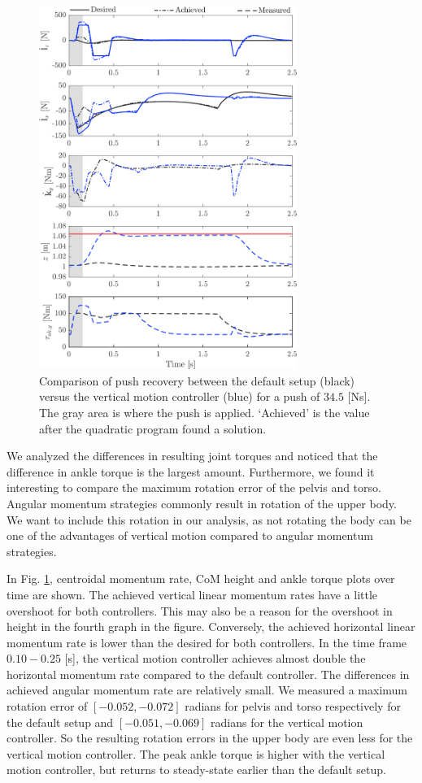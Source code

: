 \documentclass[letterpaper, 10 pt, conference]{ieeeconf}  %
\begin{document}
\begin{figure}[h]
      \centering
      \includegraphics[width=3.3in]{valcomparetime.png}
      \caption{Comparison of push recovery between the default setup (black) versus the vertical motion controller (blue) for a push of $34.5$ [Ns]. The gray area is where the push is applied. `Achieved' is the value after the quadratic program found a solution.}
      \label{fig:valcompare}
\end{figure}

We analyzed the differences in resulting joint torques and noticed that the difference in ankle torque is the largest amount. Furthermore, we found it interesting to compare the maximum rotation error of the pelvis and torso. Angular momentum strategies commonly result in rotation of the upper body. We want to include this rotation in our analysis, as not rotating the body can be one of the advantages of vertical motion compared to angular momentum strategies.

In Fig. \ref{fig:valcompare}, centroidal momentum rate, CoM height and ankle torque plots over time are shown. The achieved vertical linear momentum rates have a little overshoot for both controllers. This may also be a reason for the overshoot in height in the fourth graph in the figure. Conversely, the achieved horizontal linear momentum rate is lower than the desired for both controllers. In the time frame $0.10-0.25$ [s], the vertical motion controller achieves almost double the horizontal momentum rate compared to the default controller. The differences in achieved angular momentum rate are relatively small. We measured a maximum rotation error of $[-0.052,-0.072]$ radians for pelvis and torso respectively for the default setup and $[-0.051,-0.069]$ radians for the vertical motion controller. So the resulting rotation errors in the upper body are even less for the vertical motion controller. The peak ankle torque is higher with the vertical motion controller, but returns to steady-state earlier than the default setup. 
\end{document}
